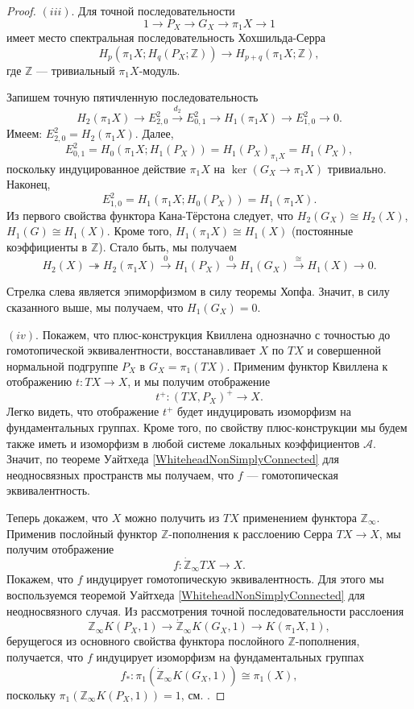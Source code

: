 \documentclass[14pt, dvipsnames]{extarticle}
\theoremstyle{definition}
\theoremstyle{remark}
\begin{document}
\begin{proof} $(iii)$. Для точной последовательности $$1\to P_X\to G_X\to \pi_1X\to 1$$ имеет место спектральная последовательность Хохшильда-Серра $$H_p(\pi_1X; H_q(P_X; \mathbb{Z}))\rightarrow H_{p+q}(\pi_1X; \mathbb{Z}),$$ где $\mathbb{Z}$ --- тривиальный $\pi_1X$-модуль.

Запишем точную пятичленную последовательность $$H_2(\pi_1X)\to E^2_{2,0}\overset{d_{2}}{\to} E^2_{0, 1}\to H_1(\pi_1X)\to E^2_{1, 0}\to 0.$$ Имеем: $E^2_{2,0} = H_2(\pi_1X)$. Далее, $$E^2_{0,1} = H_0(\pi_1X; H_1(P_X)) = H_1(P_X)_{\pi_1X} = H_1(P_X),$$ поскольку индуцированное действие $\pi_1X$ на $\ker(G_X\to \pi_1X)$ тривиально. Наконец, $$E^2_{1,0} = H_1(\pi_1X; H_0(P_X)) = H_1(\pi_1X).$$ Из первого свойства функтора Кана-Тёрстона следует, что $H_2(G_X)\cong H_2(X)$, $H_1(G)\cong H_1(X)$. Кроме того, $H_1(\pi_1X)\cong H_1(X)$ (постоянные коэффициенты в $\mathbb{Z}$). Стало быть, мы получаем $$H_2(X)\twoheadrightarrow H_2(\pi_1X)\overset{0}{\to} H_1(P_X)\overset{0}{\to} H_1(G_X)\overset{\cong}{\to} H_1(X)\to 0.$$

Стрелка слева является эпиморфизмом в силу теоремы Хопфа. Значит, в силу сказанного выше, мы получаем, что $H_1(G_X) = 0$. 



$(iv)$. Покажем, что плюс-конструкция Квиллена однозначно с точностью до гомотопической эквивалентности, восстанавливает $X$ по $TX$ и совершенной нормальной подгруппе $P_X$ в $G_X = \pi_1(TX)$. Применим функтор Квиллена к отображению $t: TX\to X$, и мы получим отображение $$t^{+}: (TX, P_X)^{+}\to X.$$ Легко видеть, что отображение $t^{+}$ будет индуцировать изоморфизм на фундаментальных группах. Кроме того, по свойству плюс-конструкции мы будем также иметь и изоморфизм в любой системе локальных коэффициентов $\mathcal{A}$. Значит, по теореме Уайтхеда \ref{WhiteheadNonSimplyConnected} для неодносвязных пространств мы получаем, что $f$ --- гомотопическая эквивалентность.




Теперь докажем, что $X$ можно получить из $TX$ применением функтора $\mathbb{Z}_\infty$. Применив послойный функтор $\mathbb{Z}$-пополнения к расслоению Серра $TX\to X$, мы получим отображение $$f: \dot{\mathbb{Z}}_\infty TX\to X.$$ Покажем, что $f$ индуцирует гомотопическую эквивалентность. Для этого мы воспользуемся теоремой Уайтхеда \ref{WhiteheadNonSimplyConnected} для неодносвязного случая. Из рассмотрения точной последовательности расслоения $$\mathbb{Z}_\infty K(P_X,1)\to \dot{\mathbb{Z}}_\infty K(G_X, 1)\to K(\pi_1X, 1),$$ берущегося из основного свойства функтора послойного $\mathbb{Z}$-пополнения, получается, что $f$ индуцирует изоморфизм на фундаментальных группах $$f_\ast: \pi_1(\dot{\mathbb{Z}}_\infty K(G_X, 1))\cong \pi_1(X),$$ поскольку $\pi_1(\mathbb{Z}_\infty K(P_X, 1)) = 1$, см. \cite{Bousfield}.


\end{proof}
\end{document}

